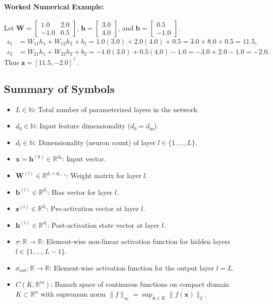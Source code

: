 \documentclass[11pt]{article}
\begin{document}
\paragraph{Worked Numerical Example:}
Let $\mathbf{W} = \begin{bmatrix} 1.0 & 2.0 \\ -1.0 & 0.5 \end{bmatrix}$, $\mathbf{h} = \begin{bmatrix} 3.0 \\ 4.0 \end{bmatrix}$, and $\mathbf{b} = \begin{bmatrix} 0.5 \\ -1.0 \end{bmatrix}$.
\begin{align}
z_1 &= W_{11} h_1 + W_{12} h_2 + b_1 = 1.0(3.0) + 2.0(4.0) + 0.5 = 3.0 + 8.0 + 0.5 = 11.5, \\
z_2 &= W_{21} h_1 + W_{22} h_2 + b_2 = -1.0(3.0) + 0.5(4.0) - 1.0 = -3.0 + 2.0 - 1.0 = -2.0.
\end{align}
Thus $\mathbf{z} = [11.5, -2.0]^\top$.

\subsection{Summary of Symbols}
\begin{itemize}
    \item $L \in \mathbb{N}$: Total number of parameterized layers in the network.
    \item $d_0 \in \mathbb{N}$: Input feature dimensionality ($d_0 = d_{\text{in}}$).
    \item $d_l \in \mathbb{N}$: Dimensionality (neuron count) of layer $l \in \{1, \dots, L\}$.
    \item $\mathbf{x} = \mathbf{h}^{(0)} \in \mathbb{R}^{d_0}$: Input vector.
    \item $\mathbf{W}^{(l)} \in \mathbb{R}^{d_l \times d_{l-1}}$: Weight matrix for layer $l$.
    \item $\mathbf{b}^{(l)} \in \mathbb{R}^{d_l}$: Bias vector for layer $l$.
    \item $\mathbf{z}^{(l)} \in \mathbb{R}^{d_l}$: Pre-activation vector at layer $l$.
    \item $\mathbf{h}^{(l)} \in \mathbb{R}^{d_l}$: Post-activation state vector at layer $l$.
    \item $\sigma: \mathbb{R} \to \mathbb{R}$: Element-wise non-linear activation function for hidden layers $l \in \{1, \dots, L-1\}$.
    \item $\sigma_{\text{out}}: \mathbb{R} \to \mathbb{R}$: Element-wise activation function for the output layer $l = L$.
    \item $C(K, \mathbb{R}^m)$: Banach space of continuous functions on compact domain $K \subset \mathbb{R}^n$ with supremum norm $\|f\|_\infty = \sup_{\mathbf{x} \in K} \|f(\mathbf{x})\|_2$.
\end{itemize}
\end{document}
